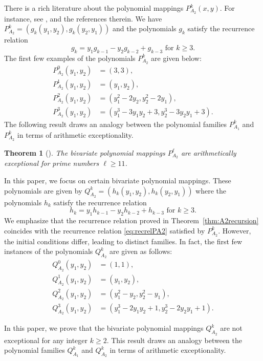 \documentclass{amsart}
\numberwithin{equation}{section}
\theoremstyle{plain}
\newtheorem{theorem}{Theorem}
\theoremstyle{definition}
\begin{document}
There is a rich literature about the polynomial mappings $P^k_{A_2}(x,y)$. For instance, see \cite{kuc07,lidlwells, uchimura}, and the references therein. We have $P^k_{A_2}=(g_k(y_1,y_2),g_k(y_2,y_1))$ and the polynomials $g_k$ satisfy the recurrence relation
\begin{equation}\label{eq:recrelPA2}
g_k = y_1g_{k-1}-y_2g_{k-2}+g_{k-3} \text{ for }k\ge 3.
\end{equation}
The first few examples of the polynomials $P^k_{A_2}$ are given below:
\begin{align*}
	P_{A_2}^0(y_1,y_2)&=(3,3),\\
	P_{A_2}^1(y_1,y_2)&=(y_1,y_2),\\
	P_{A_2}^2(y_1,y_2)&=(y_1^2-2y_2,y_2^2-2y_1),\\
	P_{A_2}^3(y_1,y_2)&=(y_1^3-3y_1y_2+3,y_2^3-3y_2y_1+3).
\end{align*}
The following result draws an analogy between the polynomial families $P^k_{A_1}$ and $P^k_{A_2}$ in terms of arithmetic exceptionality. 
\begin{theorem}[\cite{lidlwells}]\label{thm:PA2expceptional}
	The bivariate polynomial mappings $P^\ell_{A_2}$ are arithmetically exceptional for prime numbers $\ell \ge 11$.
\end{theorem}

In this paper, we focus on certain bivariate polynomial mappings. These polynomials are given by $Q^k_{A_2}=(h_k(y_1,y_2),h_k(y_2,y_1))$ where the polynomials $h_k$ satisfy the recurrence relation
\begin{equation*}\label{eq:recrelQA2}
	h_k = y_1h_{k-1}-y_2h_{k-2}+h_{k-3} \text{ for }k\ge 3.
\end{equation*}
We emphasize that the recurrence relation proved in Theorem~\ref{thm:A2recursion} coincides with the recurrence relation \eqref{eq:recrelPA2} satisfied by $P_{A_2}^k$. However, the initial conditions differ, leading to distinct families. In fact, the first few instances of the polynomials $Q^k_{A_2}$ are given as follows:
\begin{align*}
	Q_{A_2}^0(y_1,y_2)&=(1,1),\\
	Q_{A_2}^1(y_1,y_2)&=(y_1,y_2),\\
	Q_{A_2}^2(y_1,y_2)&=(y_1^2-y_2,y_2^2-y_1),\\
	Q_{A_2}^3(y_1,y_2)&=(y_1^3-2y_1y_2+1,y_2^3-2y_2y_1+1).
\end{align*}

In this paper, we prove that the bivariate polynomial mappings $Q^k_{A_2}$ are not exceptional for any integer $k \ge 2$. This result draws an analogy between the polynomial families $Q^k_{A_1}$ and $Q^k_{A_2}$ in terms of arithmetic exceptionality. 
\end{document}
